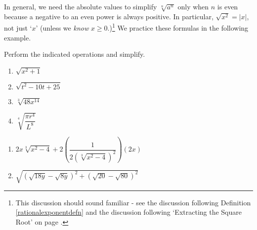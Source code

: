 \medskip

In general, we need the absolute values to simplify $\sqrt[n]{a^{n}}$ only when $n$ is even because a negative to an even power is always positive.  In particular, $\sqrt{x^2} = |x|$, not just `$x$' (unless we \textit{know} $x \geq 0$.)\footnote{This discussion should sound familiar - see the discussion following Definition \ref{rationalexponentdefn} and the discussion following `Extracting the Square Root' on page \pageref{extractingthesquareroot}.}  We practice these formulas in the following example.

\begin{ex}\label{simplifyradexpressions}  Perform the indicated operations and simplify.

\begin{multicols}{4}

\begin{enumerate}

\item  $\sqrt{x^{2} + 1}$

\item  $\sqrt{t^2-10t+25}$

\item  $\sqrt[3]{48x^{14}}$

\item  $\sqrt[4]{\dfrac{\pi r^{4}}{L^{8}}}$


\setcounter{HW}{\value{enumi}}

\end{enumerate}

\end{multicols}

\begin{multicols}{2}

\begin{enumerate}
\setcounter{enumi}{\value{HW}}

\item $2x \sqrt[3]{x^2-4} + 2\left(\dfrac{1}{2(\sqrt[3]{x^2-4})^2}\right)  (2x)$ 

\item  $\sqrt{(\sqrt{18y} - \sqrt{8y})^2 + (\sqrt{20} - \sqrt{80})^2}$ 

\end{enumerate}

\end{multicols}


\end{ex}
